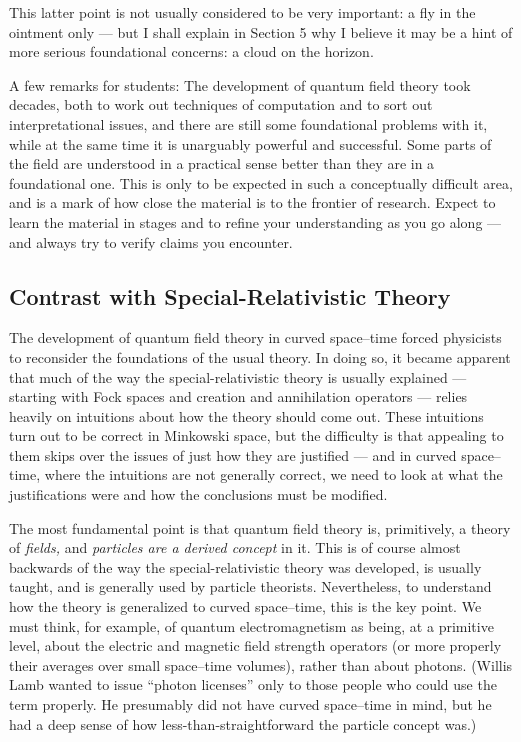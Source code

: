 \documentclass[12pt]{article}
\begin{document}
\noindent This latter point is not usually considered to be very important:  a fly in the ointment only --- but I shall explain
in Section 5 why I believe it may be a hint of more serious foundational concerns:  a cloud on the horizon.


A few remarks for students:  The development of quantum field theory took decades, both to work out techniques of computation and to sort out interpretational issues, and there are still some foundational problems with it, while at the same time it is unarguably powerful and successful.  Some parts of the field are understood in a practical sense better than they are in a foundational one.  This is only to be expected in such a conceptually difficult area, and is a mark of how close the material is to the frontier of research.  Expect to learn the material in stages and to refine your understanding as you go along --- and always try to verify claims you encounter.

\subsection{Contrast with Special-Relativistic Theory}

The development of quantum field theory in curved space--time forced physicists to reconsider the foundations of the usual theory.  In doing so, it became apparent that much of the
way the special-relativistic theory is usually explained --- starting with Fock spaces and creation and annihilation operators --- relies heavily on intuitions about how the theory should come out.  These intuitions turn out to be correct in Minkowski space, but the difficulty is that appealing to them skips over the issues of just how they are justified --- and in curved space--time, where the intuitions are not generally correct, we need to look at what the justifications were and how the conclusions must be modified.

The most fundamental point is that quantum field theory is, primitively, a theory of {\em fields,} and {\em particles are a derived concept} in it.  This is of course almost backwards of the way the special-relativistic theory was developed, is usually taught, and is generally used by particle theorists.    Nevertheless, to understand how the theory is generalized to curved space--time, this is the key point.  We must think, for example, of quantum electromagnetism as being, at a primitive level, about the electric and magnetic field strength operators (or more properly their averages over small space--time volumes), rather than about photons.  (Willis Lamb wanted to issue ``photon licenses'' only to those people who could use the term properly.  He presumably did not have curved 
space--time in mind, but he had a deep sense of how less-than-straightforward the particle concept was.)
\end{document}
